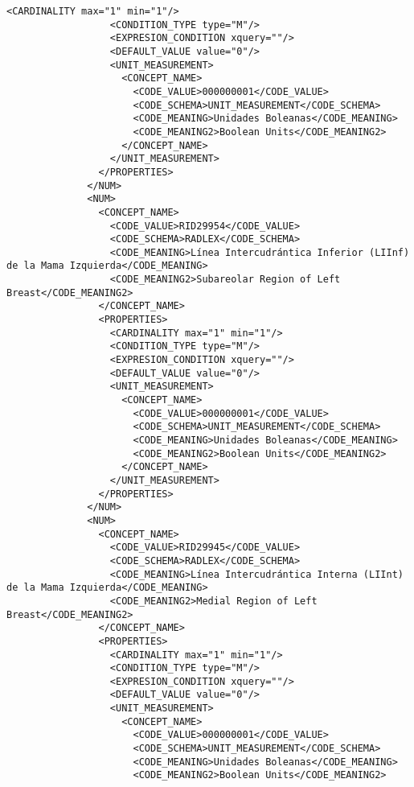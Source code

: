 \begin{lstlisting}[label=some-code,caption=Some Code]
                  <CARDINALITY max="1" min="1"/>
                  <CONDITION_TYPE type="M"/>
                  <EXPRESION_CONDITION xquery=""/>
                  <DEFAULT_VALUE value="0"/>
                  <UNIT_MEASUREMENT>
                    <CONCEPT_NAME>
                      <CODE_VALUE>000000001</CODE_VALUE>
                      <CODE_SCHEMA>UNIT_MEASUREMENT</CODE_SCHEMA>
                      <CODE_MEANING>Unidades Boleanas</CODE_MEANING>
                      <CODE_MEANING2>Boolean Units</CODE_MEANING2>
                    </CONCEPT_NAME>
                  </UNIT_MEASUREMENT>
                </PROPERTIES>
              </NUM>
              <NUM>
                <CONCEPT_NAME>
                  <CODE_VALUE>RID29954</CODE_VALUE>
                  <CODE_SCHEMA>RADLEX</CODE_SCHEMA>
                  <CODE_MEANING>Línea Intercudrántica Inferior (LIInf) de la Mama Izquierda</CODE_MEANING>
                  <CODE_MEANING2>Subareolar Region of Left Breast</CODE_MEANING2>
                </CONCEPT_NAME>
                <PROPERTIES>
                  <CARDINALITY max="1" min="1"/>
                  <CONDITION_TYPE type="M"/>
                  <EXPRESION_CONDITION xquery=""/>
                  <DEFAULT_VALUE value="0"/>
                  <UNIT_MEASUREMENT>
                    <CONCEPT_NAME>
                      <CODE_VALUE>000000001</CODE_VALUE>
                      <CODE_SCHEMA>UNIT_MEASUREMENT</CODE_SCHEMA>
                      <CODE_MEANING>Unidades Boleanas</CODE_MEANING>
                      <CODE_MEANING2>Boolean Units</CODE_MEANING2>
                    </CONCEPT_NAME>
                  </UNIT_MEASUREMENT>
                </PROPERTIES>
              </NUM>
              <NUM>
                <CONCEPT_NAME>
                  <CODE_VALUE>RID29945</CODE_VALUE>
                  <CODE_SCHEMA>RADLEX</CODE_SCHEMA>
                  <CODE_MEANING>Línea Intercudrántica Interna (LIInt) de la Mama Izquierda</CODE_MEANING>
                  <CODE_MEANING2>Medial Region of Left Breast</CODE_MEANING2>
                </CONCEPT_NAME>
                <PROPERTIES>
                  <CARDINALITY max="1" min="1"/>
                  <CONDITION_TYPE type="M"/>
                  <EXPRESION_CONDITION xquery=""/>
                  <DEFAULT_VALUE value="0"/>
                  <UNIT_MEASUREMENT>
                    <CONCEPT_NAME>
                      <CODE_VALUE>000000001</CODE_VALUE>
                      <CODE_SCHEMA>UNIT_MEASUREMENT</CODE_SCHEMA>
                      <CODE_MEANING>Unidades Boleanas</CODE_MEANING>
                      <CODE_MEANING2>Boolean Units</CODE_MEANING2>

\end{lstlisting}
